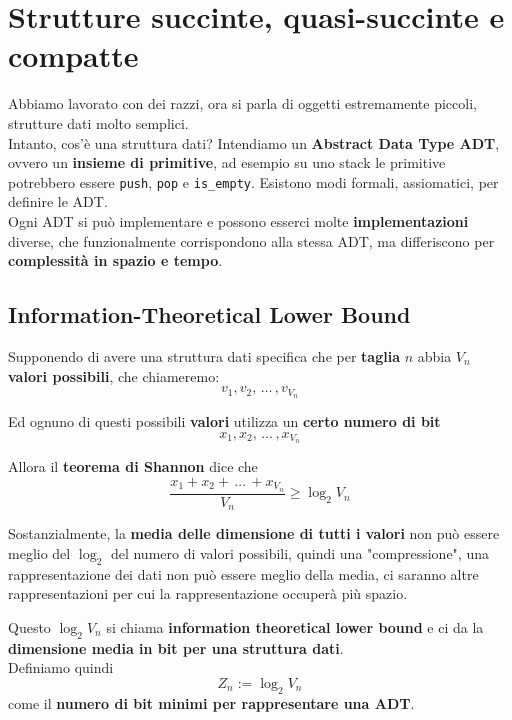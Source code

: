 
\section{Strutture succinte, quasi-succinte e compatte}
Abbiamo lavorato con dei razzi, ora si parla di oggetti estremamente piccoli, strutture dati molto semplici.\\

Intanto, cos'è una struttura dati? Intendiamo un \textbf{Abstract Data Type ADT}, ovvero un \textbf{insieme di primitive}, ad esempio su uno stack le primitive potrebbero essere \texttt{push}, \texttt{pop} e \texttt{is\_empty}. Esistono modi formali, assiomatici, per definire le ADT.\\

Ogni ADT si può implementare e possono esserci molte \textbf{implementazioni} diverse, che funzionalmente corrispondono alla stessa ADT, ma differiscono per \textbf{complessità in spazio e tempo}.\\

\subsection{Information-Theoretical Lower Bound}

Supponendo di avere una struttura dati specifica che per \textbf{taglia} $n$ abbia $V_n$ \textbf{valori possibili}, che chiameremo: 
$$ v_1, v_2, \, \dots \, , v_{V_n} $$

Ed ognuno di questi possibili \textbf{valori} utilizza un \textbf{certo numero di bit}
$$ x_1, x_2, \, \dots \, , x_{V_n}$$

Allora il \textbf{teorema di Shannon} dice che
$$ \frac{x_1 + x_2 + \, \dots \, + x_{V_n}}{V_n} \geq \log_2 V_n $$

Sostanzialmente, la \textbf{media delle dimensione di tutti i valori} non può essere meglio del $\log_2$ del numero di valori possibili, quindi una "compressione", una rappresentazione dei dati non può essere meglio della media, ci saranno altre rappresentazioni per cui la rappresentazione occuperà più spazio.\\

\newpage

Questo $\log_2 V_n$ si chiama \textbf{information theoretical lower bound} e ci da la \textbf{dimensione media in bit per una struttura dati}.\\

Definiamo quindi 
$$ Z_n := \log_2 V_n$$
come il \textbf{numero di bit minimi per rappresentare una ADT}.\\

